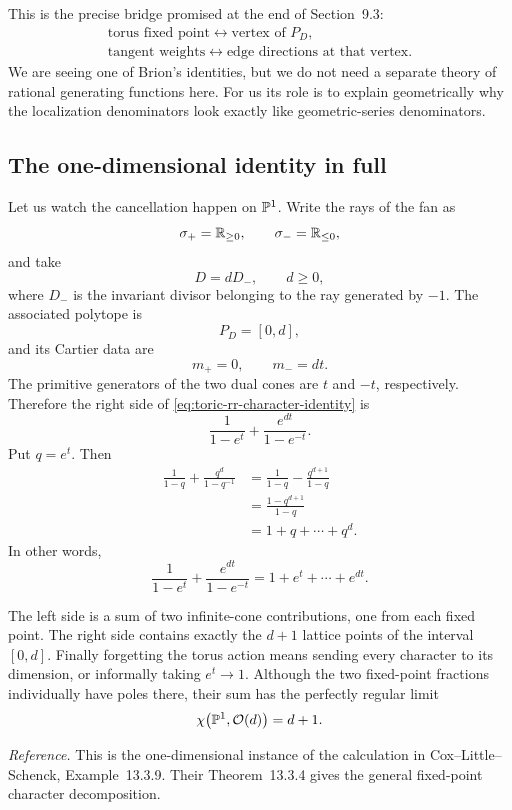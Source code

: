 \begin{pauseandthink}
This is the precise bridge promised at the end of Section~9.3:
\[
\boxed{
\begin{gathered}
\text{torus fixed point}
\longleftrightarrow
\text{vertex of }P_D,
\\[1mm]
\text{tangent weights}
\longleftrightarrow
\text{edge directions at that vertex}.
\end{gathered}
}
\]
We are seeing one of Brion's identities, but we do not need a separate
theory of rational generating functions here.  For us its role is to
explain geometrically why the localization denominators look exactly
like geometric-series denominators.
\end{pauseandthink}

\subsection{The one-dimensional identity in full}

Let us watch the cancellation happen on \(\mathbb{P}^1\).  Write the rays of
the fan as
\[
\sigma_+=\mathbb{R}_{\geq0},
\qquad
\sigma_-=\mathbb{R}_{\leq0},
\]
and take
\[
D=dD_-,\qquad d\geq0,
\]
where \(D_-\) is the invariant divisor belonging to the ray generated
by \(-1\).  The associated polytope is
\[
P_D=[0,d],
\]
and its Cartier data are
\[
m_+=0,
\qquad
m_-=dt.
\]
The primitive generators of the two dual cones are \(t\) and \(-t\),
respectively.  Therefore the right side of
\eqref{eq:toric-rr-character-identity} is
\[
\frac{1}{1-e^t}
+
\frac{e^{dt}}{1-e^{-t}}.
\]
Put \(q=e^t\).  Then
\[
\begin{aligned}
\frac{1}{1-q}
+
\frac{q^d}{1-q^{-1}}
&=
\frac{1}{1-q}
-
\frac{q^{d+1}}{1-q}
\\
&=
\frac{1-q^{d+1}}{1-q}
\\
&=
1+q+\cdots+q^d.
\end{aligned}
\]
In other words,
\[
\boxed{
\frac{1}{1-e^t}
+
\frac{e^{dt}}{1-e^{-t}}
=
1+e^t+\cdots+e^{dt}.
}
\]

The left side is a sum of two infinite-cone contributions, one from
each fixed point.  The right side contains exactly the \(d+1\) lattice
points of the interval \([0,d]\).  Finally forgetting the torus action
means sending every character to its dimension, or informally taking
\(e^t\to1\).  Although the two fixed-point fractions individually have
poles there, their sum has the perfectly regular limit
\[
\chi\bigl(\mathbb{P}^1,\mathcal O(d)\bigr)=d+1.
\]

\noindent
\textit{Reference.}
This is the one-dimensional instance of the calculation in
Cox--Little--Schenck, Example~13.3.9.  Their Theorem~13.3.4 gives the
general fixed-point character decomposition.

